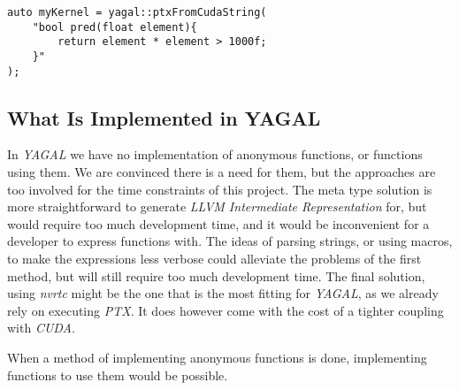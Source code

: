 \begin{lstlisting}[caption={Code showing a possible construction of a kernel based on a string. The string is being sent to the library, where it get extended to correct \textit{CUDA C}, before being sent to \textit{nvrtc}.}, label={code:metaBuildNvrtc}]
auto myKernel = yagal::ptxFromCudaString(
    "bool pred(float element){
        return element * element > 1000f;
    }"
);
\end{lstlisting}

\subsection{What Is Implemented in YAGAL}
In \textit{YAGAL} we have no implementation of anonymous functions, or functions using them. We are convinced there is a need for them, but the approaches are too involved for the time constraints of this project. The meta type solution is more straightforward to generate \textit{LLVM Intermediate Representation} for, but would require too much development time, and it would be inconvenient for a developer to express functions with. The ideas of parsing strings, or using macros, to make the expressions less verbose could alleviate the problems of the first method, but will still require too much development time. The final solution, using \textit{nvrtc} might be the one that is the most fitting for \textit{YAGAL}, as we already rely on executing \textit{PTX}. It does however come with the cost of a tighter coupling with \textit{CUDA}.

When a method of implementing anonymous functions is done, implementing functions to use them would be possible.